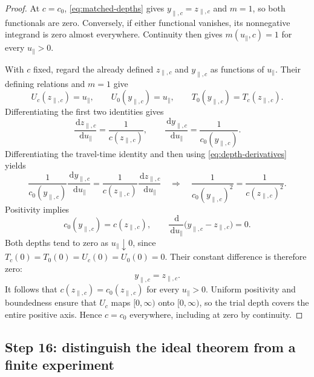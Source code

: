 \documentclass[11pt]{article}
\newcommand{\dd}{\,\mathrm{d}}
\begin{document}
\begin{proof}
At $c=c_0$, \eqref{eq:matched-depths} gives
$y_{\parallel,c}=z_{\parallel,c}$ and $m=1$, so both functionals are
zero. Conversely, if either functional vanishes, its nonnegative
integrand is zero almost everywhere. Continuity then gives
$m(u_\parallel,c)=1$ for every $u_\parallel>0$.

With $c$ fixed, regard the already defined
$z_{\parallel,c}$ and $y_{\parallel,c}$ as functions of
$u_\parallel$. Their defining relations and $m=1$ give
\begin{equation}
U_c(z_{\parallel,c})=u_\parallel,\qquad
U_0(y_{\parallel,c})=u_\parallel,\qquad
T_0(y_{\parallel,c})=T_c(z_{\parallel,c}).
\label{eq:uniqueness-identities}
\end{equation}
Differentiating the first two identities gives
\begin{equation}
\frac{\dd z_{\parallel,c}}{\dd u_\parallel}
=\frac{1}{c(z_{\parallel,c})},\qquad
\frac{\dd y_{\parallel,c}}{\dd u_\parallel}
=\frac{1}{c_0(y_{\parallel,c})}.
\label{eq:depth-derivatives}
\end{equation}
Differentiating the travel-time identity and then using
\eqref{eq:depth-derivatives} yields
\begin{equation}
\frac{1}{c_0(y_{\parallel,c})}
\frac{\dd y_{\parallel,c}}{\dd u_\parallel}
=\frac{1}{c(z_{\parallel,c})}
\frac{\dd z_{\parallel,c}}{\dd u_\parallel}
\quad\Longrightarrow\quad
\frac{1}{c_0(y_{\parallel,c})^2}
=\frac{1}{c(z_{\parallel,c})^2}.
\end{equation}
Positivity implies
\begin{equation}
c_0(y_{\parallel,c})=c(z_{\parallel,c}),
\qquad
\frac{\dd}{\dd u_\parallel}
\big(y_{\parallel,c}-z_{\parallel,c}\big)=0.
\end{equation}
Both depths tend to zero as $u_\parallel\downarrow0$, since
$T_c(0)=T_0(0)=U_c(0)=U_0(0)=0$. Their constant difference is
therefore zero:
\begin{equation}
y_{\parallel,c}=z_{\parallel,c}.
\end{equation}
It follows that $c(z_{\parallel,c})=c_0(z_{\parallel,c})$ for every
$u_\parallel>0$. Uniform positivity and boundedness ensure that
$U_c$ maps $[0,\infty)$ onto $[0,\infty)$, so the trial depth covers
the entire positive axis. Hence $c=c_0$ everywhere, including at zero
by continuity.
\end{proof}

\subsection{Step 16: distinguish the ideal theorem from a finite experiment}
\end{document}

